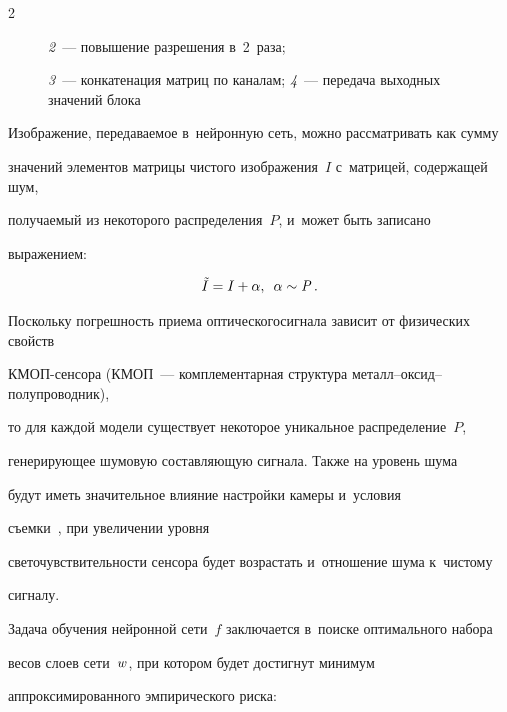 \begin{multicols}{2}
\begin{figure}
{    \textit{2}~--- повышение разрешения в~2~раза;


    \textit{3}~--- конкатенация матриц по каналам; \textit{4}~--- передача выходных значений блока}


    \label{fig:unet_scheme}


\end{figure}





Изображение, передаваемое в~нейронную сеть, можно рассматривать как сумму 


значений элементов матрицы чистого изображения~$I$ с~матрицей, содержащей шум, 


получаемый из некоторого распределения~$\mathit{P}$, и~может быть записано 


выражением:


\begin{equation*}


\label{eq:input_image_def}


    \tilde{I} = I + \alpha,\enskip \alpha \sim \mathit{P}\,.


\end{equation*}





Поскольку погрешность приема оптического\linebreak сигнала зависит от физических свойств 


КМОП-сен\-со\-ра (КМОП~--- комплементарная структура \mbox{ме\-талл}--ок\-сид--по\-лу\-про\-вод\-ник), 


то для каждой модели существует некоторое уникальное распределение~$\mathit{P}$, 


генерирующее шумовую составляющую сигнала. Также на уровень шума 


будут иметь значительное влияние настройки камеры и~условия 


съемки~\cite{IMAGE_NOISE_CONDITIONS}, при увеличении уровня 


светочувствительности сенсора будет возрастать и~отношение шума к~чистому 


сигналу.





Задача обучения нейронной сети~$f$ заключается в~поиске оптимального набора 


весов слоев сети~$\mathnormal{w}$, при котором будет достигнут минимум 


аппроксимированного эмпирического риска:






\end{multicols}
